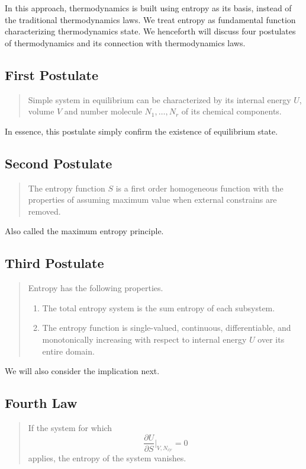 \documentclass[../../../Main.tex]{subfiles}
\begin{document}
In this approach, thermodynamics is built using entropy as its basis, instead of the traditional thermodynamics laws. We treat entropy as fundamental function characterizing thermodynamics state. We henceforth will discuss four postulates of thermodynamics and its connection with thermodynamics laws.

\subsection*{First Postulate}
\begin{quote}
    Simple system in equilibrium can be characterized by its internal energy $U$, volume $V$ and number molecule $N_1,\dots,N_r$ of its chemical components.
\end{quote}

In essence, this postulate simply confirm the existence of equilibrium state.

\subsection*{Second Postulate}
\begin{quote}
    The entropy function $S$ is a first order homogeneous function with the properties of assuming maximum value when external constrains are removed.
\end{quote}

Also called the maximum entropy principle.

\subsection*{Third Postulate}
\begin{quote}
    Entropy has the following properties.
\begin{enumerate}
    \item The total entropy system is the sum entropy of each subsystem. 
    \item The entropy function is single-valued, continuous, differentiable, and monotonically increasing with respect to internal energy $U$ over its entire domain.
\end{enumerate}
\end{quote}

We will also consider the implication next.

\subsection*{Fourth Law}
\begin{quote}
    If the system for which
\begin{equation*}
    \frac{\partial U}{\partial S}\bigg|_{V,N_{i|r}}=0
\end{equation*}
applies, the entropy of the system vanishes.
\end{quote}
\end{document}
